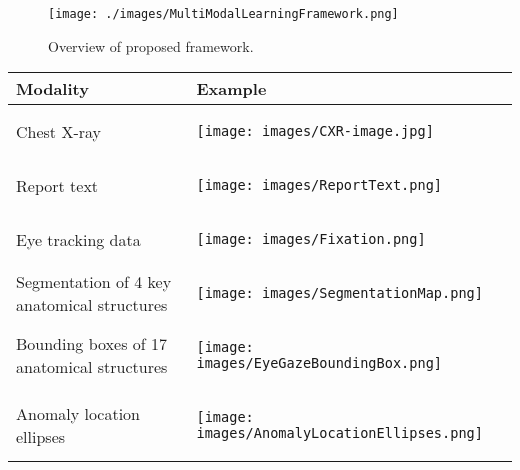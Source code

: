 \begin{figure}[!h]
    \centering
    \texttt{[image: ./images/MultiModalLearningFramework.png]}
    \caption{Overview of proposed framework.}
    \label{fig: proposed_framework}
\end{figure}

\begin{longtable}{|m{10em}|m{30em}|}
    \hline
    Modality                                                                           & Example                                                                                            \\ \hline
    Chest X-ray \citep{Johnson2019MIMIC_CXR} \citep{DJohnson2019MIMIC_CXR_JPG}         & \begin{center}\texttt{[image: images/CXR-image.jpg]}\end{center}               \\ \hline
    Report text \citep{Johnson2019MIMIC_CXR} \citep{DJohnson2019MIMIC_CXR_JPG}         & \begin{center}\texttt{[image: images/ReportText.png]}\end{center}              \\ \hline
    Eye tracking data \citep{Karargyris2020EyeGazeDataset} \citep{Lanfredi2021REFLACX} & \begin{center}\texttt{[image: images/Fixation.png]}\end{center}
    \\ \hline
    Segmentation of 4 key anatomical structures  \citep{Karargyris2020EyeGazeDataset}  & \begin{center}\texttt{[image: images/SegmentationMap.png]}\end{center}
    \\ \hline
    Bounding boxes of 17 anatomical structures  \citep{Karargyris2020EyeGazeDataset}   & \begin{center}\texttt{[image: images/EyeGazeBoundingBox.png]}\end{center}
    \\ \hline
    Anomaly location ellipses \citep{Lanfredi2021REFLACX}                              & \begin{center}\texttt{[image: images/AnomalyLocationEllipses.png]}\end{center}
    \\ \hline

\end{longtable}
